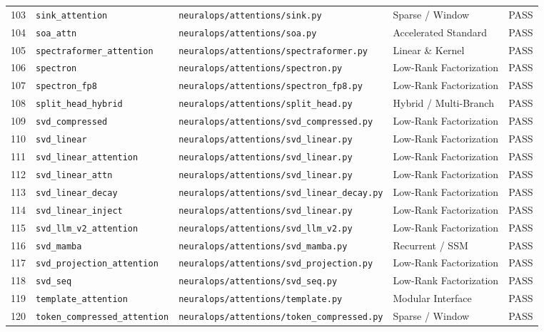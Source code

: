 \begin{center}
\begin{longtable}{rllll}
103 & \texttt{sink\_attention} & \texttt{neuralops/attentions/sink.py} & Sparse / Window & PASS \\
104 & \texttt{soa\_attn} & \texttt{neuralops/attentions/soa.py} & Accelerated Standard & PASS \\
105 & \texttt{spectraformer\_attention} & \texttt{neuralops/attentions/spectraformer.py} & Linear \& Kernel & PASS \\
106 & \texttt{spectron} & \texttt{neuralops/attentions/spectron.py} & Low-Rank Factorization & PASS \\
107 & \texttt{spectron\_fp8} & \texttt{neuralops/attentions/spectron\_fp8.py} & Low-Rank Factorization & PASS \\
108 & \texttt{split\_head\_hybrid} & \texttt{neuralops/attentions/split\_head.py} & Hybrid / Multi-Branch & PASS \\
109 & \texttt{svd\_compressed} & \texttt{neuralops/attentions/svd\_compressed.py} & Low-Rank Factorization & PASS \\
110 & \texttt{svd\_linear} & \texttt{neuralops/attentions/svd\_linear.py} & Low-Rank Factorization & PASS \\
111 & \texttt{svd\_linear\_attention} & \texttt{neuralops/attentions/svd\_linear.py} & Low-Rank Factorization & PASS \\
112 & \texttt{svd\_linear\_attn} & \texttt{neuralops/attentions/svd\_linear.py} & Low-Rank Factorization & PASS \\
113 & \texttt{svd\_linear\_decay} & \texttt{neuralops/attentions/svd\_linear\_decay.py} & Low-Rank Factorization & PASS \\
114 & \texttt{svd\_linear\_inject} & \texttt{neuralops/attentions/svd\_linear.py} & Low-Rank Factorization & PASS \\
115 & \texttt{svd\_llm\_v2\_attention} & \texttt{neuralops/attentions/svd\_llm\_v2.py} & Low-Rank Factorization & PASS \\
116 & \texttt{svd\_mamba} & \texttt{neuralops/attentions/svd\_mamba.py} & Recurrent / SSM & PASS \\
117 & \texttt{svd\_projection\_attention} & \texttt{neuralops/attentions/svd\_projection.py} & Low-Rank Factorization & PASS \\
118 & \texttt{svd\_seq} & \texttt{neuralops/attentions/svd\_seq.py} & Low-Rank Factorization & PASS \\
119 & \texttt{template\_attention} & \texttt{neuralops/attentions/template.py} & Modular Interface & PASS \\
120 & \texttt{token\_compressed\_attention} & \texttt{neuralops/attentions/token\_compressed.py} & Sparse / Window & PASS \\

\end{longtable}
\end{center}
